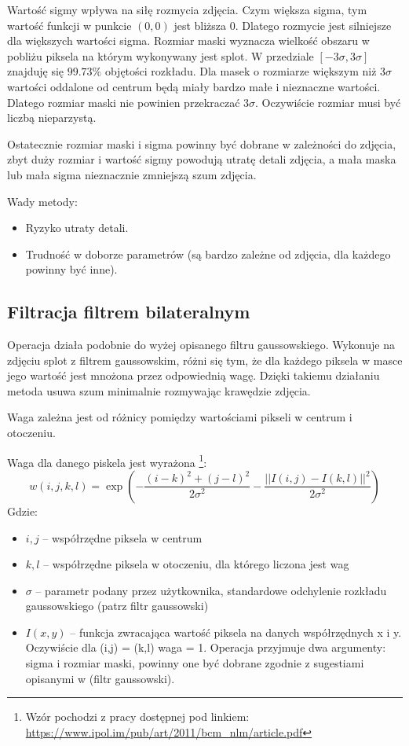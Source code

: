 \documentclass[]{mwart}
\begin{document}
Wartość sigmy wpływa na siłę rozmycia zdjęcia. Czym większa sigma, tym wartość funkcji w
punkcie $(0,0)$ jest bliższa $0$. Dlatego rozmycie jest silniejsze dla większych wartości sigma.
Rozmiar maski wyznacza wielkość obszaru w pobliżu piksela na którym wykonywany jest splot.
W przedziale $[-3 \sigma, 3\sigma]$ znajduję się $99.73\%$ objętości
rozkładu. Dla masek o rozmiarze większym niż $3\sigma$ wartości oddalone od centrum będą miały
bardzo małe i nieznaczne wartości. Dlatego rozmiar maski nie powinien przekraczać $3\sigma$.
Oczywiście rozmiar musi być liczbą nieparzystą. \newline

Ostatecznie rozmiar maski i sigma powinny być dobrane w zależności do zdjęcia, zbyt duży
rozmiar i wartość sigmy powodują utratę detali zdjęcia, a mała maska lub mała sigma nieznacznie
zmniejszą szum zdjęcia. \newline

Wady metody:
\begin{itemize}
    \item Ryzyko utraty detali.
    \item Trudność w doborze parametrów (są bardzo zależne od zdjęcia, dla każdego powinny być inne).
\end{itemize}

\subsection{Filtracja filtrem bilateralnym}
Operacja działa podobnie do wyżej opisanego filtru gaussowskiego. Wykonuje na zdjęciu splot z
filtrem gaussowskim, różni się tym, że dla każdego piksela w masce jego wartość jest mnożona
przez odpowiednią wagę. Dzięki takiemu działaniu metoda usuwa szum minimalnie rozmywając
krawędzie zdjęcia.

Waga zależna jest od różnicy pomiędzy wartościami pikseli w centrum i otoczeniu.

Waga dla danego piskela jest wyrażona \footnote{Wzór pochodzi z pracy dostępnej pod linkiem: \url{https://www.ipol.im/pub/art/2011/bcm_nlm/article.pdf} }:
\[w(i,j,k,l) = \exp \left(-\frac{(i-k)^2+(j-l)^2}{2\sigma^2}- \frac{||I(i,j) - I(k,l)||^2}{2\sigma^2}\right)\]
Gdzie:
\begin{itemize}
    \item $i,j$ -- współrzędne piksela w centrum
    \item $k,l$ -- współrzędne piksela w otoczeniu, dla którego liczona jest wag
    \item $\sigma$ -- parametr podany przez użytkownika, standardowe odchylenie rozkładu gaussowskiego (patrz filtr gaussowski)
    \item $I(x,y)$ -- funkcja zwracająca wartość piksela na danych współrzędnych x i y. Oczywiście dla (i,j) = (k,l) waga = 1. Operacja przyjmuje dwa argumenty: sigma i rozmiar maski, powinny one być dobrane zgodnie z sugestiami opisanymi w (filtr gaussowski).
\end{itemize}
\newpage
\end{document}
